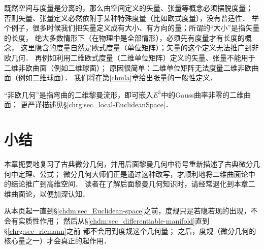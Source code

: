 既然空间与度量是分离的，那么由空间定义的矢量、张量等概念必须摆脱度量；
否则矢量、张量定义必然依附于某种特殊度量（比如欧式度量），没有普适性．
举个例子，很多时候我们把矢量定义成有大小、有方向的量；所谓的“大小”是指矢量的长度，
绝大多数情形下（在物理中是全部情形），必须先有度量才有长度的概念，
这里隐含的度量自然是欧式度量（单位矩阵）；矢量的这个定义无法推广到非欧几何．
再例如利用二维欧式度量（二维单位矩阵）定义的矢量、张量不能用于二维非欧曲面（例如二维球面）；
原因很简单：二维单位矩阵无法度量二维非欧曲面（例如二维球面）．
我们将在第\ref{chmla}章给出张量的一般性定义．

\begin{remark}
	“非欧几何”是指弯曲的二维黎曼流形，即可嵌入$E^3$中的Gauss曲率非零的二维曲面；
	更严谨描述见\S\ref{chrg:sec_local-EuclideanSpace}．
\end{remark}


\section*{小结}
本章扼要地复习了古典微分几何，并用后面黎曼几何中符号重新描述了古典微分几何中定理、公式；
微分几何大师们正是通过这种改写，才顺利地将二维曲面论中的结论推广到高维空间．
读者在了解后面黎曼几何知识时，请经常退化到本章二维曲面论，以便加深认知．


从本页起一直到\S\ref{chdm:sec_Euclidean-space}之前，度规只是若隐若现的出现，不会有实质性作用；
然后从\S\ref{chdm:sec_differentiable-manifold}直到\S\ref{chrg:sec_riemann}之前
都不会用到度规这个几何量；
之后，度规（微分几何的核心量之一）才会真正的起作用．


\printbibliography[heading=subbibliography,title=第\ref{chcdg}章参考文献]


\endinput
